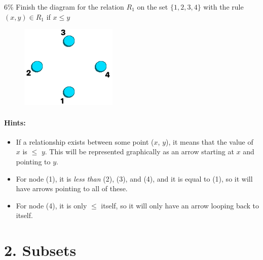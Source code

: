 \documentclass[a4paper,12pt]{book}
\begin{document}
        \begin{question}{2}{6\%}
            Finish the diagram for the relation $R_{1}$ on the set $\{1, 2, 3, 4\}$ with the rule
            $(x, y) \in R_{1}$ if $x \leq y$
            
            \begin{figure}
                \includegraphics[height=4cm]{images/5-3-question-relation.png}
            \end{figure}

            \paragraph{Hints:}
            \begin{itemize}
                \item If a relationship exists between some point ($x$, $y$),
                    it means that the value of $x$ is $\leq$ $y$. This will
                    be represented graphically as an arrow starting at $x$ and
                    pointing to $y$.
                \item For node (1), it is \textit{less than} (2), (3), and (4),
                    and it is equal to (1), so it will have arrows pointing
                    to all of these.

                \item For node (4), it is only $\leq$ itself, so it will only
                    have an arrow looping back to itself.
            \end{itemize}
        \end{question}
        
    \newpage
    \section*{2. Subsets}
\end{document}
